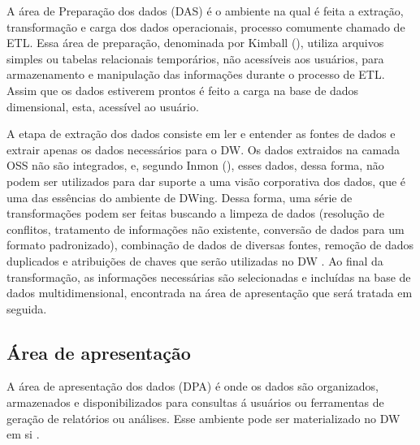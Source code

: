 A área de Preparação dos dados (DAS) é o ambiente na qual é feita a extração, transformação e carga dos dados operacionais, processo comumente chamado de ETL. Essa área de preparação, denominada por Kimball (\citeyear{kimball2002}), utiliza arquivos simples ou tabelas relacionais temporários, não acessíveis aos usuários, para armazenamento e manipulação das informações durante o processo de ETL. Assim que os dados estiverem prontos é feito a carga na base de dados dimensional, esta, acessível ao usuário.

%

A etapa de extração dos dados consiste em ler e entender as fontes de dados e extrair apenas os dados necessários para o DW. Os dados extraidos na camada OSS não são integrados, e, segundo Inmon (\citeyear{inmon2002}), esses dados, dessa forma, não podem ser utilizados para dar suporte a uma visão corporativa dos dados, que é uma das essências do ambiente de DWing. Dessa forma, uma série de transformações podem ser feitas buscando a limpeza de dados (resolução de conflitos, tratamento de informações não existente, conversão de dados para um formato padronizado), combinação de dados de diversas fontes, remoção de dados duplicados e atribuições de chaves que serão utilizadas no DW \cite{kimball2002}. Ao final da transformação, as informações necessárias são selecionadas e incluídas na base de dados multidimensional, encontrada na área de apresentação que será tratada em seguida.

\subsection{Área de apresentação}

A área de apresentação dos dados (DPA) é onde os dados são organizados, armazenados e disponibilizados para consultas á usuários ou ferramentas de geração de relatórios ou análises. Esse ambiente pode ser materializado no DW em si \cite{kimball2002}. 

%

